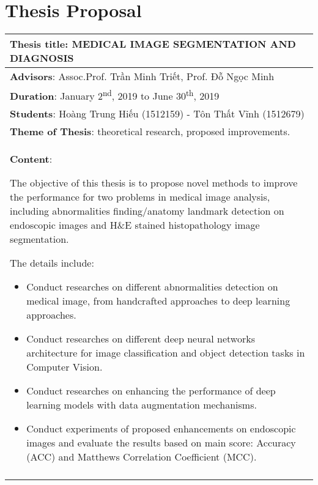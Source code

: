\chapter{Thesis Proposal}
\begin{longtable}{|l|c|}
\hline
\multicolumn{2}{|m{\linewidth}|}{\textbf{Thesis title}: MEDICAL IMAGE SEGMENTATION AND DIAGNOSIS
}\\
\hline
\multicolumn{2}{|m{\linewidth}|}{\textbf{Advisors}: Assoc.Prof. Trần Minh Triết, Prof. Đỗ Ngọc Minh} \\
\hline
\multicolumn{2}{|m{\linewidth}|}{\textbf{Duration}: January 2\textsuperscript{nd}, 2019 to June 30\textsuperscript{th}, 2019}\\
\hline
\multicolumn{2}{|m{\linewidth}|}{\textbf{Students}: Hoàng Trung Hiếu (1512159) - Tôn Thất Vĩnh (1512679)}\\
\hline
\multicolumn{2}{|m{\linewidth}|}{\textbf{Theme of Thesis}: theoretical research, proposed improvements.}\\
\hline
\multicolumn{2}{|m{\linewidth}|}{\textbf{Content}:\par
The objective of this thesis is to propose novel methods to improve the performance for two problems in medical image analysis, including abnormalities finding/anatomy landmark detection on endoscopic images and H\&E stained histopathology image segmentation.\par
The details include:
\begin{itemize}
\item Conduct researches on different abnormalities detection on medical image, from handcrafted approaches to deep learning approaches. 

\item Conduct researches on different deep neural networks architecture for image classification and object detection tasks in Computer Vision.

\item Conduct researches on enhancing the performance of deep learning models with data augmentation mechanisms.

\item Conduct experiments of proposed enhancements on endoscopic images and evaluate the results based on main score: Accuracy (ACC) and Matthews Correlation Coefficient (MCC).

\end{itemize}}\\
\hline
\multicolumn{2}{|m{\linewidth}|}{\begin{itemize}


\end{itemize}}
\end{longtable}
